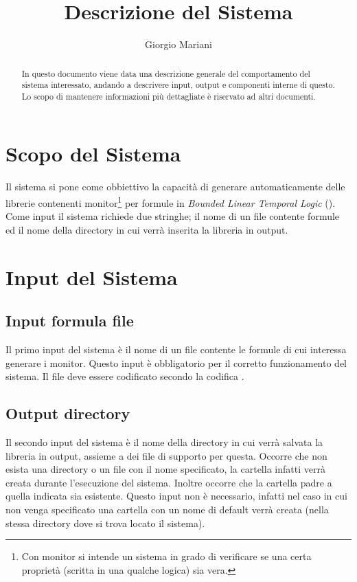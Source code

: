 \documentclass[10pt,a4paper]{article}
\author{Giorgio Mariani}
\date{}
\title{Descrizione del Sistema}
\begin{document}
  	\maketitle{}
	\begin{abstract}
		In questo documento viene data una descrizione generale del comportamento del sistema interessato, andando a descrivere input, output e componenti interne di questo. Lo scopo di mantenere informazioni più dettagliate è riservato ad altri documenti.
	\end{abstract}
	
	\section{Scopo del Sistema}
	Il sistema si pone come obbiettivo la capacità di generare automaticamente delle librerie \Simulink{} contenenti monitor\footnote{Con monitor si intende un sistema in grado di verificare se una certa proprietà (scritta in una qualche logica) sia vera.} per formule in \emph{Bounded Linear Temporal Logic} (\BLTL{}).
	Come input il sistema richiede due stringhe; il nome di un file contente formule \BLTL{} ed il nome della directory in cui verrà inserita la libreria in output.
	
	\section{Input del Sistema}
	
	\begin{multicols}{2}
		\subsection*{Input formula file}
		Il primo input del sistema è il nome di un file contente le formule \BLTL{} di cui interessa generare i monitor. Questo input è obbligatorio per il corretto funzionamento del sistema. Il file deve essere codificato secondo la codifica \InputFileEncoding{}.
		
	\vfill\null
	\columnbreak
	
		\subsection*{Output directory} 
		Il secondo input del sistema è il nome della directory in cui verrà salvata la libreria in output, assieme a dei file di supporto per questa. Occorre che non esista una directory o un file con il nome specificato, la cartella infatti verrà creata durante l'esecuzione del sistema. Inoltre occorre che la cartella padre a quella indicata sia esistente. %
		Questo input non è necessario, infatti nel caso in cui non venga specificato una cartella con un nome di default verrà creata (nella stessa directory dove si trova locato il sistema).
	\end{multicols}
	
\end{document}
